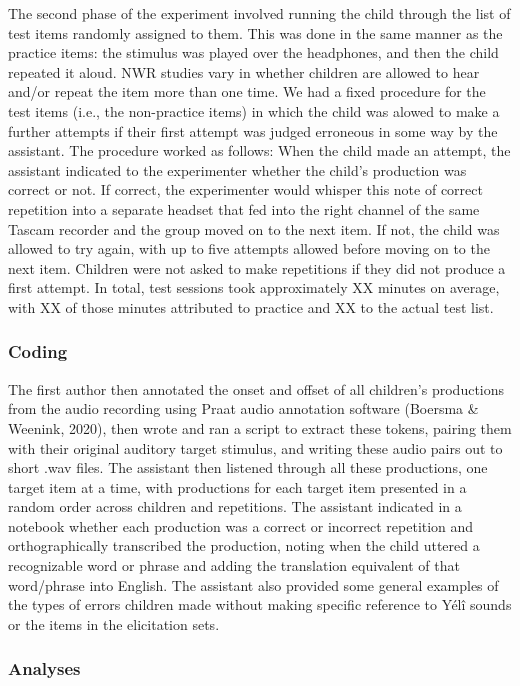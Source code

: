 \documentclass[english,,man,floatsintext]{apa6}
\begin{document}
The second phase of the experiment involved running the child through
the list of test items randomly assigned to them. This was done in the
same manner as the practice items: the stimulus was played over the
headphones, and then the child repeated it aloud. NWR studies vary in
whether children are allowed to hear and/or repeat the item more than
one time. We had a fixed procedure for the test items (i.e., the
non-practice items) in which the child was alowed to make a further
attempts if their first attempt was judged erroneous in some way by the
assistant. The procedure worked as follows: When the child made an
attempt, the assistant indicated to the experimenter whether the child's
production was correct or not. If correct, the experimenter would
whisper this note of correct repetition into a separate headset that fed
into the right channel of the same Tascam recorder and the group moved
on to the next item. If not, the child was allowed to try again, with up
to five attempts allowed before moving on to the next item. Children
were not asked to make repetitions if they did not produce a first
attempt. In total, test sessions took approximately XX minutes on
average, with XX of those minutes attributed to practice and XX to the
actual test list.

\subsubsection{Coding}\label{coding}

The first author then annotated the onset and offset of all children's
productions from the audio recording using Praat audio annotation
software (Boersma \& Weenink, 2020), then wrote and ran a script to
extract these tokens, pairing them with their original auditory target
stimulus, and writing these audio pairs out to short .wav files. The
assistant then listened through all these productions, one target item
at a time, with productions for each target item presented in a random
order across children and repetitions. The assistant indicated in a
notebook whether each production was a correct or incorrect repetition
and orthographically transcribed the production, noting when the child
uttered a recognizable word or phrase and adding the translation
equivalent of that word/phrase into English. The assistant also provided
some general examples of the types of errors children made without
making specific reference to Yélî sounds or the items in the elicitation
sets.

\subsubsection{Analyses}\label{analyses}
\end{document}
